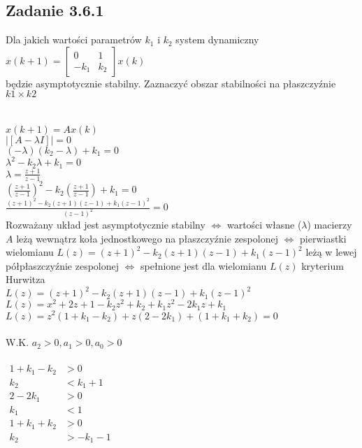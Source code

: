 \pagebreak
\subsection*{Zadanie 3.6.1} {\color{darkgray}
	Dla jakich wartości parametrów $k_1$ i $k_2$ system dynamiczny\\
	$x(k+1)=\left[ \begin{array}{cc}     0&1\\-k_1&k_2    \end{array}\right]x(k)$\\
	będzie asymptotycznie stabilny. Zaznaczyć obszar stabilności na płaszczyźnie $k1 \times k2$\\
}\lineh
\\\\
$x(k+1)=Ax(k)$\\
$| [A-\lambda I] | =0$\\
$(-\lambda)(k_2-\lambda)+k_1=0$\\
$\lambda^2-k_2\lambda+k_1=0$\\
$\lambda=\frac{z+1}{z-1}$\\
$(\frac{z+1}{z-1})^2-k_2(\frac{z+1}{z-1})+k_1=0$\\
$\frac{(z+1)^2-k_2(z+1)(z-1)+k_1(z-1)^2}{(z-1)^2}=0$\\
Rozważany układ jest asymptotycznie stabilny $\Leftrightarrow$ wartości własne ($\lambda$) macierzy $A$ leżą wewnątrz koła jednostkowego na płaszczyźnie zespolonej $\Leftrightarrow$ pierwiastki wielomianu $L(z)=(z+1)^2-k_2(z+1)(z-1)+k_1(z-1)^2$
leżą w lewej półpłaszczyźnie zespolonej $\Leftrightarrow$ spełnione jest dla wielomianu $L(z)$ kryterium Hurwitza\\
$L(z)=(z+1)^2-k_2(z+1)(z-1)+k_1(z-1)^2$\\
$L(z)=x^2+2z+1-k_2z^2+k_2+k_1z^2-2k_1z+k_1$\\
$L(z)=z^2(1+k_1-k_2)+z(2-2k_1)+(1+k_1+k_2)=0$\\
\\
W.K. $a_2>0, a_1>0, a_0>0$\\
\\
$\begin{array}{rl}    
	1+k_1-k_2&>0\\
	k_2&<k_1+1\\
	2-2k_1&>0\\
	k_1&<1\\
	1+k_1+k_2&>0\\
	k_2&>-k_1-1
\end{array}$\\
